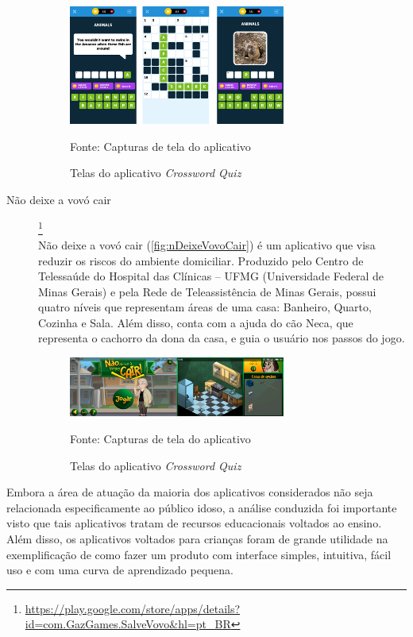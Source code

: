 \begin{description}
\begin{figure}[H]
\centering
    \caption{Telas do aplicativo \textit{Crossword Quiz}}
    \label{fig:crossQuiz}
    \includegraphics[width=0.7\textwidth]{Figuras/crosswordQuiz.jpg}
    
    Fonte: Capturas de tela do aplicativo
\end{figure}


\item[Não deixe a vovó cair]\footnote{\url{https://play.google.com/store/apps/details?id=com.GazGames.SalveVovo&hl=pt_BR}} \hfill \\
Não deixe a vovó cair (\autoref{fig:nDeixeVovoCair}) é um aplicativo que visa reduzir os riscos do ambiente domiciliar. Produzido pelo Centro de Telessaúde do Hospital das Clínicas – UFMG (Universidade Federal de Minas Gerais) e pela Rede de Teleassistência de Minas Gerais, possui quatro níveis que representam áreas de uma casa: Banheiro, Quarto, Cozinha e Sala. Além disso, conta com a ajuda do cão Neca, que representa o cachorro da dona da casa, e guia o usuário nos passos do jogo.
\begin{figure}[H]
\centering
    \caption{Telas do aplicativo \textit{Crossword Quiz}}
    \label{fig:nDeixeVovoCair}
    \includegraphics[width=0.7\textwidth]{Figuras/nDeixeVovoCair.jpg}
    
    Fonte: Capturas de tela do aplicativo
\end{figure}

\end{description}

Embora a área de atuação da maioria dos aplicativos considerados não seja relacionada especificamente ao público idoso, a análise conduzida foi importante visto que tais aplicativos tratam de recursos educacionais voltados ao ensino. Além disso, os aplicativos voltados para crianças foram de grande utilidade na exemplificação de como fazer um produto com interface simples, intuitiva, fácil uso e com uma curva de aprendizado pequena. 

